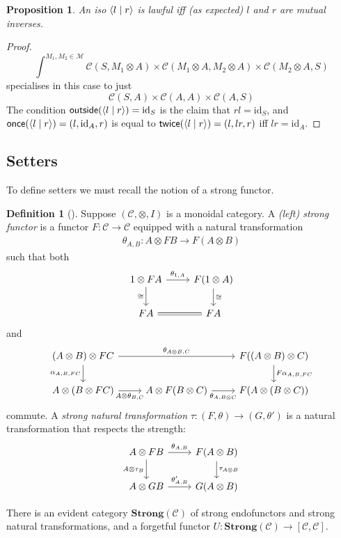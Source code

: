 \documentclass[11pt,a4paper]{article}
\theoremstyle{plain}
\newtheorem{proposition}[theorem]{Proposition}
\theoremstyle{definition}
\newtheorem{definition}[theorem]{Definition}
\newcommand{\C}{\mathscr{C}}
\newcommand{\M}{\mathscr{M}}
\newcommand{\Strong}{\mathbf{Strong}}
\newcommand{\id}{\mathrm{id}}
\newcommand{\rep}[2]{{\ensuremath \left\langle #1 \mid #2 \right\rangle}}
\newcommand{\outside}{\mathsf{outside}}
\newcommand{\once}{\mathsf{once}}
\newcommand{\twice}{\mathsf{twice}}
\begin{document}
\begin{proposition}
  An iso $\rep{l}{r }$ is lawful iff (as expected) $l$ and $r$ are mutual inverses.
\end{proposition}
\begin{proof}
  \[ \int^{M_1, M_2 \in \M} \C(S, M_1 \otimes A) \times \C(M_1 \otimes A, M_2 \otimes A) \times \C(M_2 \otimes A, S) \]
  specialises in this case to just
  \[ \C(S, A) \times \C(A, A) \times \C(A, S) \]
  The condition $\outside(\rep{l}{r }) = \id_S$ is the claim that $rl = \id_S$, and $\once(\rep{l}{r }) = (l, \id_A, r)$ is equal to $\twice(\rep{l}{r }) = (l, lr, r)$ iff $lr = \id_A$.
\end{proof}

\subsection{Setters}

To define setters we must recall the notion of a strong functor.

\begin{definition}[\cite{StrongFunctors}]
  Suppose $(\C, \otimes, I)$ is a monoidal category.  A \emph{(left) strong functor} is a functor $F : \C \to \C$ equipped with a natural transformation
  \begin{align*}
    \theta_{A,B} : A \otimes F B \to F(A \otimes B)
  \end{align*}
  such that both
  \[
    \begin{tikzcd}
      1 \otimes F A \ar[r, "\theta_{1,A}"] \ar[d, "\cong" left]  & F(1 \otimes A) \ar[d, "\cong" right] \\
      F A \ar[r, equals] & F A
    \end{tikzcd}
  \]
  and
  \[
    \begin{tikzcd}
      (A \otimes B) \otimes F C \ar[rr, "\theta_{A \otimes B, C}"] \ar[d, "\alpha_{A,B,FC}" left]  && F((A \otimes B) \otimes C) \ar[d, "F\alpha_{A,B,FC}" right] \\
      A \otimes (B \otimes F C) \ar[r, "A \otimes \theta_{B,C}" below] & A \otimes F(B \otimes C) \ar[r, "\theta_{A, B\otimes C}" below] & F(A \otimes (B \otimes C))
    \end{tikzcd}
  \]
  commute. A \emph{strong natural transformation} $\tau : (F,\theta) \to (G,\theta')$ is a natural transformation that respects the strength:
  \[
    \begin{tikzcd}
      A \otimes F B \ar[r, "\theta_{A,B}"] \ar[d, "A \otimes \tau_B" left]  & F(A \otimes B) \ar[d, "\tau_{A \otimes B}" right] \\
      A \otimes G B \ar[r, "\theta'_{A, B}"]& G(A \otimes B)
    \end{tikzcd}
  \]

  There is an evident category $\Strong(\C)$ of strong endofunctors and strong natural transformations, and a forgetful functor $U : \Strong(\C) \to [\C, \C]$.
\end{definition}
\end{document}
